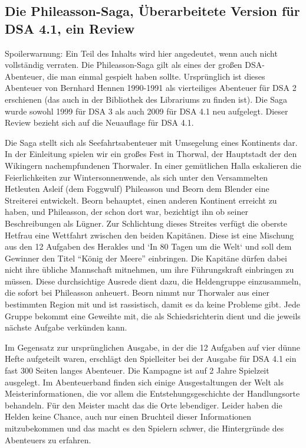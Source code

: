 \documentclass[final]{multiversum}
\begin{document}
\makemultititle
%

\subsection{Die Phileasson-Saga, Überarbeitete Version für DSA 4.1, ein Review}
Spoilerwarnung: Ein Teil des Inhalts wird hier
angedeutet, wenn auch nicht vollständig verraten.
Die Phileasson-Saga gilt als eines der großen DSA-Abenteuer, die man einmal
gespielt haben sollte. Ursprünglich ist dieses Abenteuer von Bernhard Hennen
1990-1991 als vierteiliges Abenteuer für DSA 2 erschienen (das auch in der
Bibliothek des Librariums zu finden ist). Die Saga wurde sowohl 1999 für DSA 3
als auch 2009 für DSA 4.1 neu aufgelegt. Dieser Review bezieht sich auf die
Neuauflage für DSA 4.1.

Die Saga stellt sich als Seefahrtsabenteuer mit Umsegelung eines Kontinents
dar. In der Einleitung spielen wir ein großes Fest in Thorwal, der Hauptstadt
der den Wikingern nachempfundenen Thorwaler. In einer gemütlichen Halla
eskalieren die Feierlichkeiten zur Wintersonnenwende, als sich unter den
Versammelten Hetleuten Asleif (dem Foggwulf) Phileasson und Beorn dem Blender
eine Streiterei entwickelt. Beorn behauptet, einen anderen Kontinent erreicht zu
haben, und Phileasson, der schon dort war, bezichtigt ihn ob seiner
Beschreibungen als Lügner. Zur Schlichtung dieses Streites verfügt die oberste 
Hetfrau eine Wettfahrt zwischen den beiden Kapitänen.
Diese ist eine Mischung aus den 12 Aufgaben des Herakles und `In 80 Tagen um
die Welt` und soll dem Gewinner den Titel “König der Meere” einbringen. Die Kapitäne
dürfen dabei nicht ihre übliche Mannschaft mitnehmen, um ihre Führungskraft
einbringen zu müssen. Diese durchsichtige Ausrede dient dazu, die Heldengruppe
einzusammeln, die sofort bei Phileasson anheuert. Beorn nimmt nur
Thorwaler aus einer bestimmten Region mit und ist rassistisch, damit es da keine
Probleme gibt. Jede Gruppe bekommt eine Geweihte mit, die als Schiedsrichterin
dient und die jeweils nächste Aufgabe verkünden kann.

Im Gegensatz zur ursprünglichen Ausgabe, in der die 12 Aufgaben auf vier dünne Hefte 
aufgeteilt waren, erschlägt den Spielleiter bei der
Ausgabe für DSA 4.1 ein fast 300 Seiten langes Abenteuer. Die Kampagne ist auf 2
Jahre Spielzeit ausgelegt.
Im Abenteuerband finden sich einige Ausgestaltungen der Welt als Meisterinformationen,
die vor allem die Entstehungsgeschichte der Handlungsorte behandeln. Für den 
Meister macht das die Orte lebendiger. Leider haben die Helden keine
Chance, auch nur einen Bruchteil dieser Informationen mitzubekommen und das
macht es den Spielern schwer, die Hintergründe des Abenteuers zu erfahren. 
\end{document}
